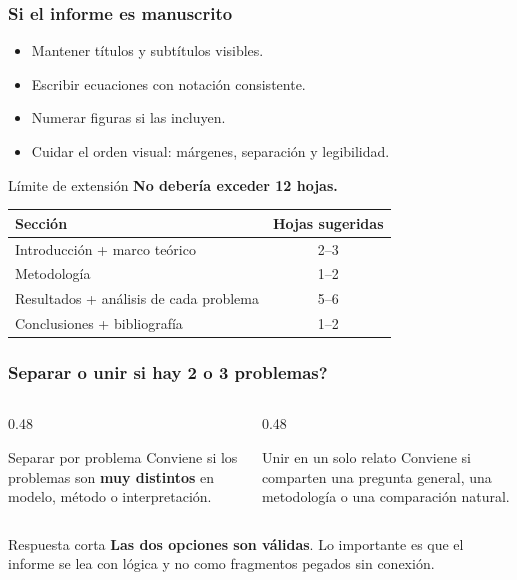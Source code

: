 \begin{frame}
\frametitle{Si el informe es manuscrito}
\begin{itemize}
    \item Mantener t\'itulos y subt\'itulos visibles.
    \item Escribir ecuaciones con notaci\'on consistente.
    \item Numerar figuras si las incluyen.
    \item Cuidar el orden visual: m\'argenes, separaci\'on y legibilidad.
\end{itemize}

\vspace{0.2cm}
\begin{block}{L\'imite de extensi\'on}
\textbf{No deber\'ia exceder 12 hojas.}
\end{block}

\vspace{0.1cm}
\begin{table}
\centering
\small
\begin{tabular}{>{\raggedright\arraybackslash}p{}c}
\toprule
Secci\'on & Hojas sugeridas \\
\midrule
Introducci\'on + marco te\'orico & 2--3 \\
Metodolog\'ia & 1--2 \\
Resultados + an\'alisis de cada problema & 5--6 \\
Conclusiones + bibliograf\'ia & 1--2 \\
\bottomrule
\end{tabular}
\end{table}
\end{frame}

\begin{frame}
\frametitle{\textquestiondown{}Separar o unir si hay 2 o 3 problemas?}
\begin{columns}[T]
\begin{column}{0.48\textwidth}
\begin{block}{Separar por problema}
Conviene si los problemas son \textbf{muy distintos} en modelo, m\'etodo o interpretaci\'on.
\end{block}
\end{column}
\begin{column}{0.48\textwidth}
\begin{block}{Unir en un solo relato}
Conviene si comparten una pregunta general, una metodolog\'ia o una comparaci\'on natural.
\end{block}
\end{column}
\end{columns}

\vspace{0.2cm}
\begin{alertblock}{Respuesta corta}
\textbf{Las dos opciones son v\'alidas}. Lo importante es que el informe se lea con l\'ogica y no como fragmentos pegados sin conexi\'on.
\end{alertblock}
\end{frame}

